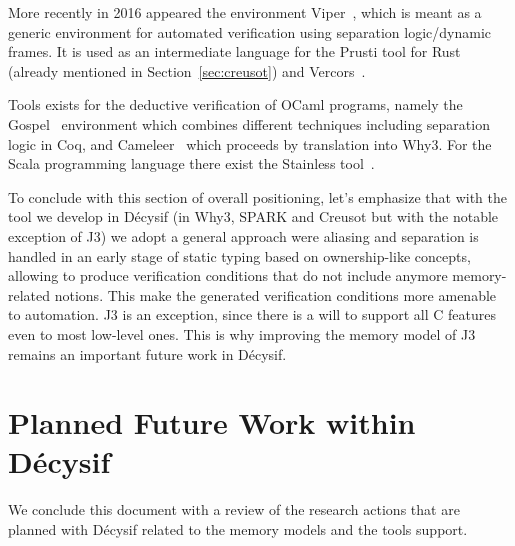 \documentclass[a4paper,11pt]{article}
\begin{document}
More recently in 2016 appeared the environment
Viper~\cite{MuellerSchwerhoffSummers16}, which is meant as a generic environment
for automated verification using separation logic/dynamic frames. It is used as
an intermediate language for the Prusti tool for Rust (already mentioned in
Section~\ref{sec:creusot}) and Vercors~\cite{armborst24cav}.

Tools exists for the deductive verification of OCaml programs, namely the
Gospel~\cite{gospelfm19} environment which combines different techniques
including separation logic in Coq, and Cameleer~\cite{DBLP:conf/cav/PereiraR20}
which proceeds by translation into Why3. For the Scala programming language
there exist the Stainless tool~\cite{chassot24ijcar}.

To conclude with this section of overall positioning, let's emphasize that with
the tool we develop in Décysif (in Why3, SPARK and Creusot but with the notable
exception of J3) we adopt a general approach were aliasing and separation is
handled in an early stage of static typing based on ownership-like concepts,
allowing to produce verification conditions that do not include anymore
memory-related notions. This make the generated verification conditions more
amenable to automation. J3 is an exception, since there is a will to support all
C features even to most low-level ones. This is why improving the memory model
of J3 remains an important future work in Décysif.

\section{Planned Future Work within Décysif}
\label{sec:future}

We conclude this document with a review of the research actions that are planned
with Décysif related to the memory models and the tools support.
\end{document}
